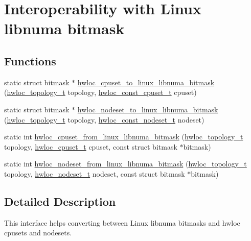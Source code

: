 \hypertarget{a00216}{}\section{Interoperability with Linux libnuma bitmask}
\label{a00216}
\subsection*{Functions}
\begin{DoxyCompactItemize}
\item 
static struct bitmask $\ast$ \hyperlink{a00216_gad8769b4544c0aeef154fc8223144e343}{hwloc\+\_\+cpuset\+\_\+to\+\_\+linux\+\_\+libnuma\+\_\+bitmask} (\hyperlink{a00186_ga9d1e76ee15a7dee158b786c30b6a6e38}{hwloc\+\_\+topology\+\_\+t} topology, \hyperlink{a00183_ga1f784433e9b606261f62d1134f6a3b25}{hwloc\+\_\+const\+\_\+cpuset\+\_\+t} cpuset)
\item 
static struct bitmask $\ast$ \hyperlink{a00216_gadfaa14c1bec76965ac2e05f0c3f3473b}{hwloc\+\_\+nodeset\+\_\+to\+\_\+linux\+\_\+libnuma\+\_\+bitmask} (\hyperlink{a00186_ga9d1e76ee15a7dee158b786c30b6a6e38}{hwloc\+\_\+topology\+\_\+t} topology, \hyperlink{a00183_ga2f5276235841ad66a79bedad16a5a10c}{hwloc\+\_\+const\+\_\+nodeset\+\_\+t} nodeset)
\item 
static int \hyperlink{a00216_ga37c8421110b1842414809019098794ef}{hwloc\+\_\+cpuset\+\_\+from\+\_\+linux\+\_\+libnuma\+\_\+bitmask} (\hyperlink{a00186_ga9d1e76ee15a7dee158b786c30b6a6e38}{hwloc\+\_\+topology\+\_\+t} topology, \hyperlink{a00183_ga4bbf39b68b6f568fb92739e7c0ea7801}{hwloc\+\_\+cpuset\+\_\+t} cpuset, const struct bitmask $\ast$bitmask)
\item 
static int \hyperlink{a00216_gaaca6bff3086aad5bdbd2f4c5f0ad14cc}{hwloc\+\_\+nodeset\+\_\+from\+\_\+linux\+\_\+libnuma\+\_\+bitmask} (\hyperlink{a00186_ga9d1e76ee15a7dee158b786c30b6a6e38}{hwloc\+\_\+topology\+\_\+t} topology, \hyperlink{a00183_ga37e35730fa7e775b5bb0afe893d6d508}{hwloc\+\_\+nodeset\+\_\+t} nodeset, const struct bitmask $\ast$bitmask)
\end{DoxyCompactItemize}


\subsection{Detailed Description}
This interface helps converting between Linux libnuma bitmasks and hwloc cpusets and nodesets.

